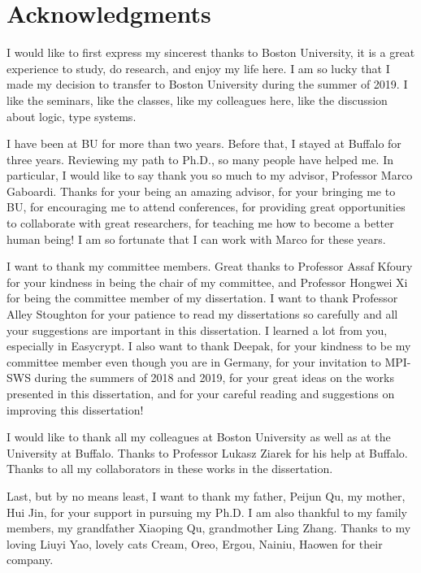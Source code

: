 \section*{Acknowledgments}

I would like to first express my sincerest thanks to Boston University, it is a great experience to study, do research, and enjoy my life here. I am so lucky that I made my decision to transfer to Boston University during the summer of 2019. I like the seminars, like the classes, like my colleagues here, like the discussion about logic, type systems. 

I have been at BU for more than two years. Before that, I stayed at Buffalo for three years. Reviewing my path to Ph.D., so many people have helped me. In particular, I would like to say thank you so much to my advisor, Professor Marco Gaboardi. Thanks for your being an amazing advisor, for your bringing me to BU, for encouraging me to attend conferences, for providing great opportunities to collaborate with great researchers, for teaching me how to become a better human being! I am so fortunate that I can work with Marco for these years.

I want to thank my committee members. Great thanks to Professor Assaf Kfoury for your kindness in being the chair of my committee, and Professor Hongwei Xi for being the committee member of my dissertation. I want to thank Professor Alley Stoughton for your patience to read my dissertations so carefully and all your suggestions are important in this dissertation. I learned a lot from you, especially in Easycrypt. I also want to thank Deepak, for your kindness to be my committee member even though you are in Germany, for your invitation to MPI-SWS during the summers of 2018 and 2019, for your great ideas on the works presented in this dissertation, and for your careful reading and suggestions on improving this dissertation!

I would like to thank all my colleagues at Boston University as well as at the University at Buffalo. Thanks to Professor Lukasz Ziarek for his help at Buffalo. Thanks to all my collaborators in these works in the dissertation.

Last, but by no means least, I want to thank my father, Peijun Qu, my mother, Hui Jin, for your support in pursuing my Ph.D. I am also thankful to my family members, my grandfather Xiaoping Qu, grandmother Ling Zhang. Thanks to my loving Liuyi Yao, lovely cats Cream, Oreo, Ergou, Nainiu, Haowen for their company. 

